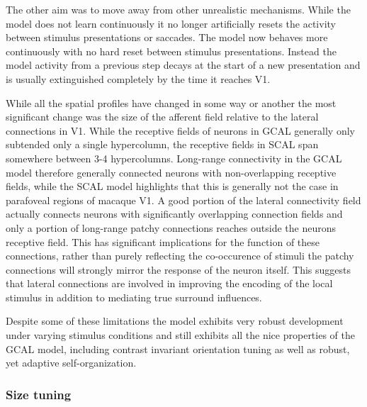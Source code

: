 The other aim was to move away from other unrealistic
mechanisms. While the model does not learn continuously it no longer
artificially resets the activity between stimulus presentations or
saccades. The model now behaves more continuously with no hard reset
between stimulus presentations. Instead the model activity from a
previous step decays at the start of a new presentation and is usually
extinguished completely by the time it reaches V1.

While all the spatial profiles have changed in some way or another the
most significant change was the size of the afferent field relative to
the lateral connections in V1. While the receptive fields of neurons
in GCAL generally only subtended only a single hypercolumn, the
receptive fields in SCAL span somewhere between 3-4
hypercolumns. Long-range connectivity in the GCAL model therefore
generally connected neurons with non-overlapping receptive fields,
while the SCAL model highlights that this is generally not the case in
parafoveal regions of macaque V1. A good portion of the lateral
connectivity field actually connects neurons with significantly
overlapping connection fields and only a portion of long-range patchy
connections reaches outside the neurons receptive field. This has
significant implications for the function of these connections, rather
than purely reflecting the co-occurence of stimuli the patchy
connections will strongly mirror the response of the neuron
itself. This suggests that lateral connections are involved in
improving the encoding of the local stimulus in addition to mediating
true surround influences.

Despite some of these limitations the model exhibits very robust
development under varying stimulus conditions and still exhibits all
the nice properties of the GCAL model, including contrast invariant
orientation tuning as well as robust, yet adaptive self-organization.

\subsubsection*{Size tuning}

